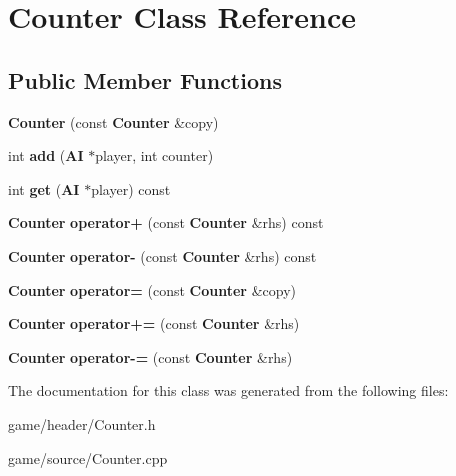 \section{Counter Class Reference}
\label{class_counter}
\subsection*{Public Member Functions}
\begin{DoxyCompactItemize}
\item 
{\bfseries Counter} (const {\bf Counter} \&copy)\label{class_counter_ae36386566b1cc1bfbce065dd182e1e1e}

\item 
int {\bfseries add} ({\bf A\-I} $\ast$player, int counter)\label{class_counter_a7f4afd6b55161dee82b1e046af77924b}

\item 
int {\bfseries get} ({\bf A\-I} $\ast$player) const \label{class_counter_a95c8f10bc296a35599cb97f3dc33f0e9}

\item 
{\bf Counter} {\bfseries operator+} (const {\bf Counter} \&rhs) const \label{class_counter_af13b8092fbef704e68fdefb2d024683a}

\item 
{\bf Counter} {\bfseries operator-\/} (const {\bf Counter} \&rhs) const \label{class_counter_a563604893f4bc66449ac9901928ebbc4}

\item 
{\bf Counter} {\bfseries operator=} (const {\bf Counter} \&copy)\label{class_counter_a683fff5c5b2fb7082f637a817106ec4f}

\item 
{\bf Counter} {\bfseries operator+=} (const {\bf Counter} \&rhs)\label{class_counter_a0923b8779d18168542db7281bdb7c6c2}

\item 
{\bf Counter} {\bfseries operator-\/=} (const {\bf Counter} \&rhs)\label{class_counter_a99857e9ec0584d6525fc49e00223b555}

\end{DoxyCompactItemize}


The documentation for this class was generated from the following files\-:\begin{DoxyCompactItemize}
\item 
game/header/Counter.\-h\item 
game/source/Counter.\-cpp\end{DoxyCompactItemize}
